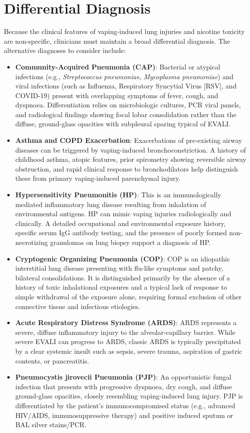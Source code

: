 \section*{Differential Diagnosis}
Because the clinical features of vaping-induced lung injuries and nicotine toxicity are non-specific, clinicians must maintain a broad differential diagnosis. The alternative diagnoses to consider include:
\begin{itemize}
    \item \textbf{Community-Acquired Pneumonia (CAP)}: Bacterial or atypical infections (e.g., \textit{Streptococcus pneumoniae}, \textit{Mycoplasma pneumoniae}) and viral infections (such as Influenza, Respiratory Syncytial Virus [RSV], and COVID-19) present with overlapping symptoms of fever, cough, and dyspnoea. Differentiation relies on microbiologic cultures, PCR viral panels, and radiological findings showing focal lobar consolidation rather than the diffuse, ground-glass opacities with subpleural sparing typical of EVALI.
    \item \textbf{Asthma and COPD Exacerbation}: Exacerbations of pre-existing airway diseases can be triggered by vaping-induced bronchoconstriction. A history of childhood asthma, atopic features, prior spirometry showing reversible airway obstruction, and rapid clinical response to bronchodilators help distinguish these from primary vaping-induced parenchymal injury.
    \item \textbf{Hypersensitivity Pneumonitis (HP)}: This is an immunologically mediated inflammatory lung disease resulting from inhalation of environmental antigens. HP can mimic vaping injuries radiologically and clinically. A detailed occupational and environmental exposure history, specific serum IgG antibody testing, and the presence of poorly formed non-necrotizing granulomas on lung biopsy support a diagnosis of HP.
    \item \textbf{Cryptogenic Organizing Pneumonia (COP)}: COP is an idiopathic interstitial lung disease presenting with flu-like symptoms and patchy, bilateral consolidations. It is distinguished primarily by the absence of a history of toxic inhalational exposures and a typical lack of response to simple withdrawal of the exposure alone, requiring formal exclusion of other connective tissue and infectious etiologies.
    \item \textbf{Acute Respiratory Distress Syndrome (ARDS)}: ARDS represents a severe, diffuse inflammatory injury to the alveolar-capillary barrier. While severe EVALI can progress to ARDS, classic ARDS is typically precipitated by a clear systemic insult such as sepsis, severe trauma, aspiration of gastric contents, or pancreatitis.
    \item \textbf{Pneumocystis jirovecii Pneumonia (PJP)}: An opportunistic fungal infection that presents with progressive dyspnoea, dry cough, and diffuse ground-glass opacities, closely resembling vaping-induced lung injury. PJP is differentiated by the patient's immunocompromised status (e.g., advanced HIV/AIDS, immunosuppressive therapy) and positive induced sputum or BAL silver stains/PCR.
\end{itemize}

